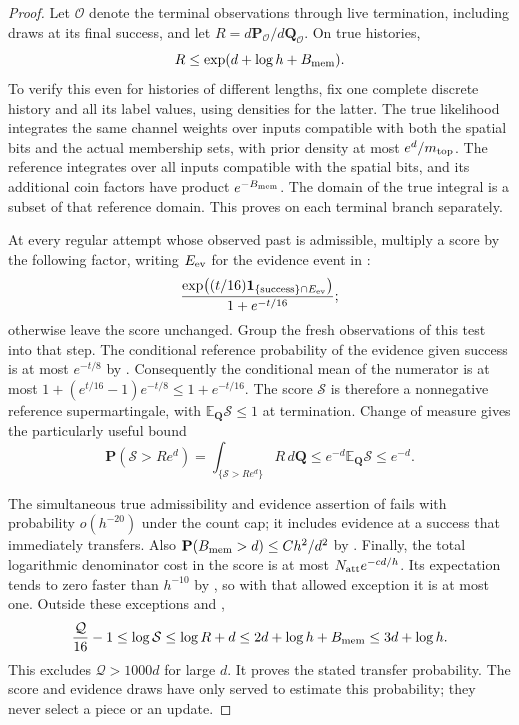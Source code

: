 \begin{proof}
Let $\mathcal O$ denote the terminal observations through live
termination, including draws at its final success, and let
$R=d\mathbf P_{\mathcal O}/d\mathbf Q_{\mathcal O}$.  On true
histories,
\begin{equation}
 R\le\exp(d+\log h+B_{\rm mem}).
 \label{eq:06-reference-ratio}
\end{equation}
To verify this even for histories of different lengths, fix one
complete discrete history and all its label values, using densities
for the latter.  The true likelihood integrates the same channel
weights over inputs compatible with both the spatial bits and the
actual membership sets, with prior density at most
$e^d/m_{\rm top}$.  The reference integrates over all inputs
compatible with the spatial bits, and its additional coin factors
have product $e^{-B_{\rm mem}}$.  The domain of the true integral
is a subset of that reference domain.  This proves
 on each terminal branch separately.

At every regular attempt whose observed past is admissible, multiply
a score by the following factor, writing $E_{\rm ev}$ for the
evidence event in :
\[
 \frac{\exp\bigl((t/16)\mathbf1_{
       \{\mathrm{success}\}\cap E_{\rm ev}}\bigr)}
      {1+e^{-t/16}};
\]
otherwise leave the score unchanged.  Group the fresh observations
of this test into that step.  The conditional reference probability
of the evidence given success is at most $e^{-t/8}$ by
.  Consequently the conditional mean
of the numerator is at most
$1+(e^{t/16}-1)e^{-t/8}\le1+e^{-t/16}$.
The score $\mathcal S$ is therefore a nonnegative reference
supermartingale, with $\mathbb E_{\mathbf Q}\mathcal S\le1$ at
termination.  Change of measure gives the particularly useful bound
\begin{equation}
 \mathbf P(\mathcal S>Re^d)
   =\int_{\{\mathcal S>Re^d\}}R\,d\mathbf Q
   \le e^{-d}\mathbb E_{\mathbf Q}\mathcal S\le e^{-d}.
 \label{eq:06-score-transfer}
\end{equation}

The simultaneous true admissibility and evidence assertion of
 fails with probability $o(h^{-20})$
under the count cap; it includes evidence at a success that
immediately transfers.  Also
$\mathbf P(B_{\rm mem}>d)\le Ch^2/d^2$ by
.  Finally, the total logarithmic denominator
cost in the score is at most
$N_{\rm att}e^{-c d/h}$.  Its expectation tends to zero faster than
$h^{-10}$ by , so with that allowed
exception it is at most one.  Outside these exceptions and
,
\[
 \frac{\mathcal Q}{16}-1
       \le\log\mathcal S
       \le\log R+d
       \le2d+\log h+B_{\rm mem}
       \le3d+\log h.
\]
This excludes $\mathcal Q>1000d$ for large $d$.  It proves the
stated transfer probability.  The score and evidence draws have
only served to estimate this probability; they never select a
piece or an update.


\end{proof}

